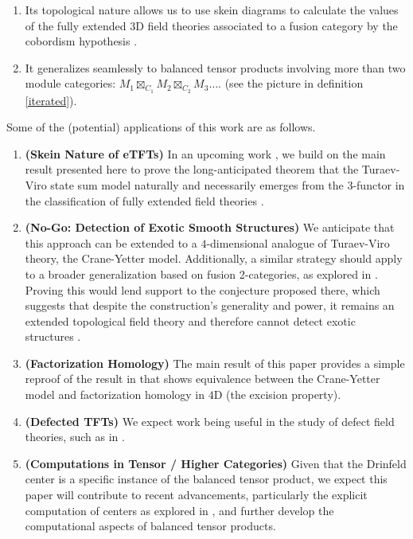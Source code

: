 \begin{enumerate}
  \item Its topological nature allows us to use skein diagrams to calculate the
        values of the fully extended $3$D field theories associated to a
        fusion category by the cobordism hypothesis \cite{lurie/tqft}
        \cite{douglas/dualizable-tensor-categories}
        \cite{guu/tv-as-3-functor}.
  \item It generalizes seamlessly to balanced tensor products involving more than
        two module categories: $M_1 \boxtimes_{C_1} M_2 \boxtimes_{C_2} M_3 \ldots$.
        (see the picture in definition \ref{iterated}).
      \end{enumerate}

\noindent Some of the (potential) applications of this work are as follows.

\begin{enumerate}
  \item \textbf{(Skein Nature of eTFTs)} In an upcoming work
        \cite{guu/tv-as-3-functor}, we build on the main result presented here
        to prove the long-anticipated theorem that the Turaev-Viro state sum
        model \cite{viro/turaev-viro-model} naturally and necessarily emerges
        from the 3-functor in the classification of fully extended field
        theories \cite{lurie/tqft} \cite{douglas/dualizable-tensor-categories}.
  \item \textbf{(No-Go: Detection of Exotic Smooth Structures)} We anticipate
        that this approach can be extended to a $4$-dimensional analogue of
        Turaev-Viro theory, the Crane-Yetter model. Additionally, a similar
        strategy should apply to a broader generalization based on fusion
        2-categories, as explored in \cite{douglas/fusion-2-cat-4d-tqft}.
        Proving this would lend support to the conjecture proposed there,
        which suggests that despite the construction's generality and power,
        it remains an extended topological field theory and therefore cannot
        detect exotic structures \cite{reutter/no-go-exotic}.
  \item \textbf{(Factorization Homology)} The main result of this paper
        provides a simple reproof of the result in
        \cite{kirillov/fact-homo-4d-tqft} that shows equivalence between the
        Crane-Yetter model and factorization homology
        \cite{ayala/factorization-homology} in $4$D (the excision property).
  \item \textbf{(Defected TFTs)} We expect work being useful in the study of
        defect field theories, such as in \cite{meusburger/defect-tv}.
  \item \textbf{(Computations in Tensor / Higher Categories)} Given that the
        Drinfeld center is a specific instance of the balanced tensor product,
        we expect this paper will contribute to recent advancements,
        particularly the explicit computation of centers as explored in
        \cite{maurer/computing-center}, and further develop the computational
        aspects of balanced tensor products.
\end{enumerate}

